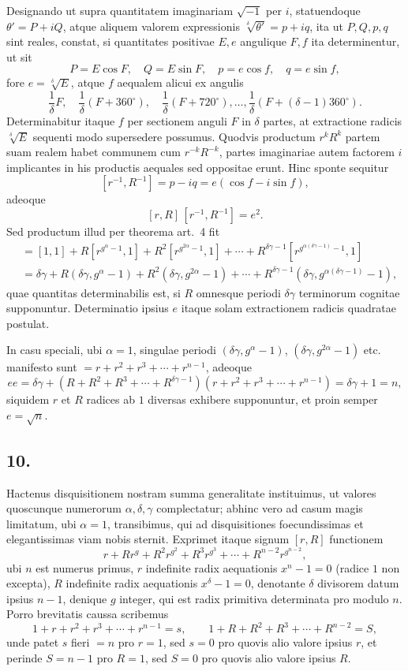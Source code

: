 \documentclass[12pt]{article}
\begin{document}
Designando ut supra quantitatem imaginariam $\sqrt{-1}$ per $i$, statuendoque $\theta'=P+iQ$, atque aliquem valorem expressionis $\sqrt[\delta]{\theta'}=p+iq$, ita ut $P,Q,p,q$ sint reales, constat, si quantitates positivae $E,e$ angulique $F,f$ ita determinentur, ut sit
\[
P=E\cos F,\quad Q=E\sin F,\quad p=e\cos f,\quad q=e\sin f,
\]
fore $e=\sqrt[\delta]{E}$, atque $f$ aequalem alicui ex angulis
\[
\frac1\delta F,\quad \frac1\delta(F+360^\circ),\quad \frac1\delta(F+720^\circ),\ldots,
\frac1\delta(F+(\delta-1)360^\circ).
\]
Determinabitur itaque $f$ per sectionem anguli $F$ in $\delta$ partes, at extractione radicis $\sqrt[\delta]{E}$ sequenti modo supersedere possumus. Quodvis productum $r^kR^k$ partem suam realem habet communem cum $r^{-k}R^{-k}$, partes imaginariae autem factorem $i$ implicantes in his productis aequales sed oppositae erunt. Hinc sponte sequitur
\[
[r^{-1},R^{-1}]=p-iq=e(\cos f-i\sin f),
\]
adeoque
\[
[r,R]\,[r^{-1},R^{-1}]=e^2.
\]
Sed productum illud per theorema art.~4 fit
\[
\begin{aligned}
&=[1,1]+R[r^{g^\alpha-1},1]+R^2[r^{g^{2\alpha}-1},1]+\cdots+R^{\delta\gamma-1}[r^{g^{\alpha(\delta\gamma-1)}-1},1]\\
&=\delta\gamma+R(\delta\gamma,g^\alpha-1)+R^2(\delta\gamma,g^{2\alpha}-1)+\cdots+
R^{\delta\gamma-1}(\delta\gamma,g^{\alpha(\delta\gamma-1)}-1),
\end{aligned}
\]
quae quantitas determinabilis est, si $R$ omnesque periodi $\delta\gamma$ terminorum cognitae supponuntur. Determinatio ipsius $e$ itaque solam extractionem radicis quadratae postulat.

In casu speciali, ubi $\alpha=1$, singulae periodi $(\delta\gamma,g^\alpha-1)$, $(\delta\gamma,g^{2\alpha}-1)$ etc. manifesto sunt $=r+r^2+r^3+\cdots+r^{n-1}$, adeoque
\[
ee=\delta\gamma+(R+R^2+R^3+\cdots+R^{\delta\gamma-1})(r+r^2+r^3+\cdots+r^{n-1})
=\delta\gamma+1=n,
\]
siquidem $r$ et $R$ radices ab $1$ diversas exhibere supponuntur, et proin semper $e=\sqrt n$.

\subsection*{10.}

Hactenus disquisitionem nostram summa generalitate instituimus, ut valores quoscunque numerorum $\alpha,\delta,\gamma$ complectatur; abhinc vero ad casum magis limitatum, ubi $\alpha=1$, transibimus, qui ad disquisitiones foecundissimas et elegantissimas viam nobis sternit. Exprimet itaque signum $[r,R]$ functionem
\[
r+Rr^g+R^2r^{g^2}+R^3r^{g^3}+\cdots+R^{n-2}r^{g^{n-2}},
\]
ubi $n$ est numerus primus, $r$ indefinite radix aequationis $x^n-1=0$ (radice $1$ non excepta), $R$ indefinite radix aequationis $x^\delta-1=0$, denotante $\delta$ divisorem datum ipsius $n-1$, denique $g$ integer, qui est radix primitiva determinata pro modulo $n$. Porro brevitatis caussa scribemus
\[
1+r+r^2+r^3+\cdots+r^{n-1}=s,\qquad
1+R+R^2+R^3+\cdots+R^{n-2}=S,
\]
unde patet $s$ fieri $=n$ pro $r=1$, sed $s=0$ pro quovis alio valore ipsius $r$, et perinde $S=n-1$ pro $R=1$, sed $S=0$ pro quovis alio valore ipsius $R$.
\end{document}
